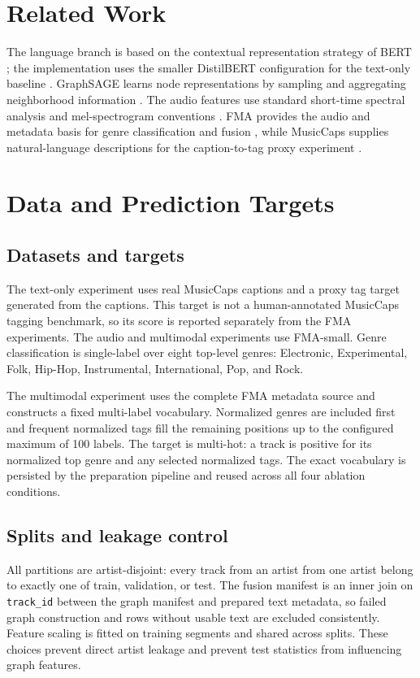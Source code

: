 \documentclass[conference]{IEEEtran}
\begin{document}
\section{Related Work}
The language branch is based on the contextual representation strategy of
BERT \cite{devlin2019bert}; the implementation uses the smaller
DistilBERT configuration for the text-only baseline
\cite{sanh2019distilbert}. GraphSAGE learns node representations by sampling
and aggregating neighborhood information \cite{hamilton2017inductive}.
The audio features use standard short-time spectral analysis and
mel-spectrogram conventions \cite{mcfee2015librosa}. FMA provides the
audio and metadata basis for genre classification and fusion
\cite{defferrard2017fma}, while MusicCaps supplies natural-language
descriptions for the caption-to-tag proxy experiment
\cite{agostinelli2023musiclm}.

\section{Data and Prediction Targets}
\subsection{Datasets and targets}
The text-only experiment uses real MusicCaps captions and a proxy tag target
generated from the captions. This target is not a human-annotated
MusicCaps tagging benchmark, so its score is reported separately from the
FMA experiments. The audio and multimodal experiments use FMA-small. Genre
classification is single-label over eight top-level genres:
Electronic, Experimental, Folk, Hip-Hop, Instrumental, International, Pop,
and Rock.

The multimodal experiment uses the complete FMA metadata source and constructs a fixed
multi-label vocabulary. Normalized genres are included first and frequent
normalized tags fill the remaining positions up to the configured maximum
of 100 labels. The target is multi-hot: a track is positive for its normalized
top genre and any selected normalized tags. The exact vocabulary is persisted
by the preparation pipeline and reused across all four ablation conditions.

\subsection{Splits and leakage control}
All partitions are artist-disjoint: every track from an artist
from one artist belong to exactly one of train, validation, or test. The
fusion manifest is an inner join on \texttt{track\_id} between the graph
manifest and prepared text metadata, so failed graph construction and rows
without usable text are excluded consistently. Feature scaling is fitted on
training segments and shared across splits. These choices prevent direct
artist leakage and prevent test statistics from influencing graph features.
\end{document}
